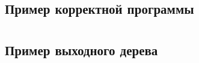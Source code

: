 \documentclass[a4paper,12pt]{report}
\numberwithin{equation}{section}
\begin{document}
\subsection*{Пример корректной программы}

\clearpage

\section*{} 
\subsection*{Пример выходного дерева}

\clearpage
\end{document}
